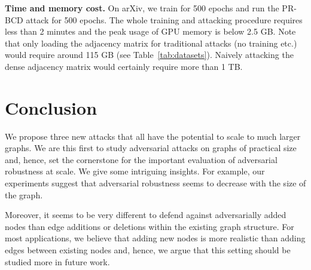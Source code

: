 \documentclass[letterpaper]{article} %
\begin{document}
\textbf{Time and memory cost.} On arXiv, we train for 500 epochs and run the PR-BCD attack for 500 epochs. The whole training and attacking procedure requires less than 2 minutes and the peak usage of GPU memory is below 2.5 GB. 
Note that only loading the adjacency matrix for traditional attacks (no training etc.) would require around 115 GB (see Table~\ref{tab:datasets}). Naively attacking the dense adjacency matrix would certainly require more than 1 TB.

\section{Conclusion}\label{sec:conclusion} %

We propose three new attacks that all have the potential to scale to much larger graphs. We are this first to study adversarial attacks on graphs of practical size and, hence, set the cornerstone for the important evaluation of adversarial robustness at scale. We give some intriguing insights. For example, our experiments suggest that adversarial robustness seems to decrease with the size of the graph.

Moreover, it seems to be very different to defend against adversarially added nodes than edge additions or deletions within the existing graph structure. For most applications, we believe that adding new nodes is more realistic than adding edges between existing nodes and, hence, we argue that this setting should be studied more in future work.


\end{document}

